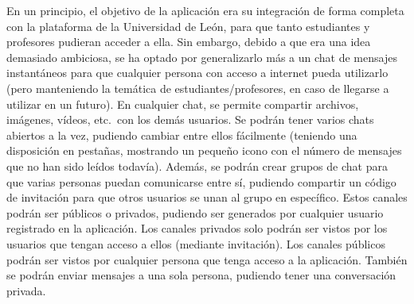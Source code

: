 En un principio, el objetivo de la aplicación era su integración de forma completa con la plataforma de
la Universidad de León, para que tanto estudiantes y profesores pudieran acceder a ella.
Sin embargo, debido a que era una idea demasiado ambiciosa, se ha optado por generalizarlo más a un chat de
mensajes instantáneos para que cualquier persona con acceso a internet pueda utilizarlo (pero manteniendo la temática
de estudiantes/profesores, en caso de llegarse a utilizar en un futuro).
En cualquier chat, se permite compartir archivos, imágenes, vídeos, etc.\ con los demás usuarios.
Se podrán tener varios chats abiertos a la vez, pudiendo cambiar entre ellos fácilmente (teniendo una disposición en
pestañas, mostrando un pequeño icono con el número de mensajes que no han sido leídos todavía).
Además, se podrán crear grupos de chat para que varias personas puedan
comunicarse entre sí, pudiendo compartir un código de invitación para que otros usuarios se unan al grupo en específico.
Estos canales podrán ser públicos o privados, pudiendo ser generados por cualquier usuario registrado en la
aplicación.
Los canales privados solo podrán ser vistos por los usuarios que tengan acceso a ellos (mediante invitación).
Los canales públicos podrán ser vistos por cualquier persona que tenga acceso a la aplicación.
También se podrán enviar mensajes a una sola persona, pudiendo tener una conversación privada.
